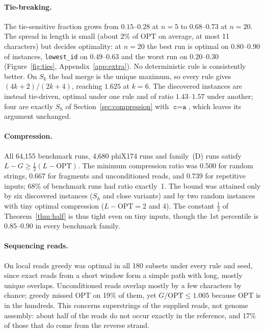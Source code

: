 \documentclass[11pt,a4paper]{article}   %
\theoremstyle{compact}
\theoremstyle{compactdef}
\newcommand{\OPT}{\mathrm{OPT}}
\newcommand{\GR}{G}                         %
\newcommand{\str}[1]{\texttt{#1}}           %
\begin{document}
\paragraph{Tie-breaking.} The tie-sensitive fraction grows from
$0.15$--$0.28$ at $n=5$ to $0.68$--$0.73$ at $n=20$. The spread in length is
small (about $2\%$ of $\OPT$ on average, at most 11 characters) but decides
optimality: at $n=20$ the best run is optimal on $0.80$--$0.90$ of
instances, \texttt{lowest\_id} on $0.49$--$0.63$ and the worst run on
$0.20$--$0.30$ (Figure~\ref{fig:ties}, Appendix~\ref{app:extra}). No deterministic rule is
consistently better. On $S_k$ the bad merge is the unique maximum, so every
rule gives $(4k+2)/(2k+4)$, reaching $1.625$ at $k=6$. The discovered
instances are instead tie-driven, optimal under one rule and of ratio
$1.43$--$1.57$ under another; four are exactly $S_h$ of
Section~\ref{sec:compression} with $\str{c}=\str{a}$, which leaves its
argument unchanged.

\paragraph{Compression.} All 64{,}155 benchmark runs, 4{,}680 phiX174 runs
and family~(D) runs satisfy $L-\GR\ge\frac12(L-\OPT)$. The minimum
compression ratio was $0.500$ for random strings, $0.667$ for fragments and
unconditioned reads, and $0.739$ for repetitive inputs; 68\% of benchmark
runs had ratio exactly~1. The bound was attained only by six discovered
instances ($S_h$ and close variants) and by two random instances with tiny
optimal compression ($L-\OPT=2$ and $4$). The constant $\frac12$ of
Theorem~\ref{thm:half} is thus tight even on tiny inputs, though the 1st
percentile is $0.85$--$0.90$ in every benchmark family.

\paragraph{Sequencing reads.} On local reads greedy was optimal in all 180
subsets under every rule and seed, since exact reads from a short window
form a simple path with long, mostly unique overlaps. Unconditioned reads
overlap mostly by a few characters by chance; greedy missed $\OPT$ on 19\%
of them, yet $\GR/\OPT\le1.005$ because $\OPT$ is in the hundreds. This
concerns superstrings of the supplied reads, not genome assembly: about half
of the reads do not occur exactly in the reference, and 17\% of those that
do come from the reverse strand.
\end{document}
